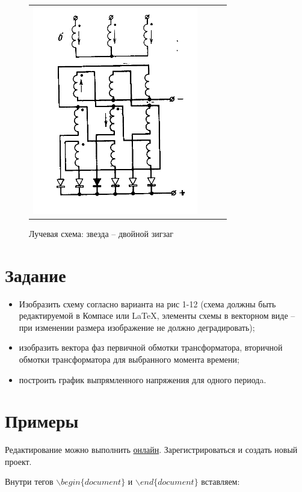 \begin{figure}[!ht]
\begin{tabular}{cccc}
\begin{minipage}{0.22\textwidth}
        \includegraphics[scale=0.3]{schema12}
	\caption{\small Лучевая схема: звезда -- двойной зигзаг}
\end{minipage}
       \\
\end{tabular}
\end{figure}


\section*{Задание}
\begin{itemize}
	\item Изобразить схему согласно варианта на рис 1-12 (схема должны быть редактируемой в Компасе или \LaTeX \cite{circuitikz}, элементы схемы в векторном виде -- при изменении размера изображение не должно деградировать);
	\item изобразить вектора фаз первичной обмотки трансформатора, вторичной обмотки трансформатора для выбранного момента времени;
	\item построить график выпрямленного напряжения для одного периодa.

\end{itemize}



\section*{Примеры}

Редактирование можно выполнить \href{overleaf.com}{онлайн}.
Зарегистрироваться и создать новый проект.



Внутри тегов $\backslash begin\{document\}$ и $\backslash end\{document\}$ вставляем: 

